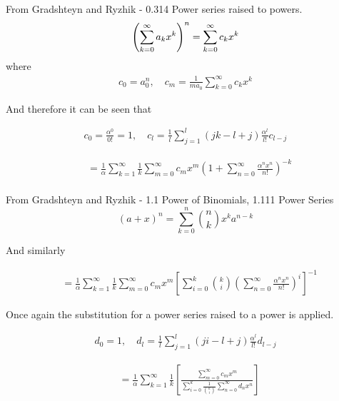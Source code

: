 From Gradshteyn and Ryzhik - 0.314 Power series raised to powers.
\begin{equation}
	\left(\sum\limits_{k=0}^{\infty}a_{k}x^{k}\right)^{n} = \sum\limits_{k=0}^{\infty}c_{k}x^{k} \\
	\label{eqn:power series raised to powers}
\end{equation}
where
\begin{align*}
	c_{0} = a_{0}^{n}, \quad c_{m} = \frac{1}{ma_{0}}\sum\limits_{k=0}^{\infty}c_{k}x^{k}
\end{align*}

And therefore it can be seen that

\begin{align*}
	c_{0} = \frac{\alpha^{0}}{0!}=1, \quad c_{l} = \frac{1}{l}\sum\limits_{j=1}^{l}(jk-l+j)\frac{\alpha^{l}}{l!}c_{l-j}
\end{align*}

\begin{align*}
	& = \frac{1}{\alpha}\sum\limits_{k=1}^{\infty}\frac{1}{k}\sum\limits_{m=0}^{\infty}c_{m}x^{m}\left( 1+\sum\limits_{n=0}^{\infty}\frac{\alpha^{n}x^{n}}{n!}\right)^{-k} \\
\end{align*}

From Gradshteyn and Ryzhik - 1.1 Power of Binomials, 1.111 Power Series
\begin{equation}
	(a+x)^n = \sum\limits_{k=0}^{n}{n \choose k}x^k a^{n-k}
\end{equation}

And similarly

\begin{align*}
	& = \frac{1}{\alpha}\sum\limits_{k=1}^{\infty}\frac{1}{k}\sum\limits_{m=0}^{\infty}c_mx^m
	\left[ \sum\limits_{i=0}^{k}{k \choose i} \left( \sum\limits_{n=0}^{\infty}\frac{\alpha^nx^n}{n!} \right)^{i} \right]^{-1}
\end{align*}

Once again the substitution for a power series raised to a power is applied.

\begin{align*}
	d_{0} = 1, \quad d_{l}=\frac{1}{l}\sum\limits_{j=1}^{l}(ji-l+j)\frac{\alpha^{l}}{l!}d_{l-j}
\end{align*}

\begin{align*}
	& = \frac{1}{\alpha}\sum\limits_{k=1}^{\infty}\frac{1}{k}\left[ \frac{\sum\limits_{m=0}^{\infty}c_{m}x^{m}}{\sum\limits_{i=0}^{k}\frac{1}{{k \choose i}}\sum\limits_{n=0}^{\infty}d_{n}x^{n}} \right]
\end{align*}

